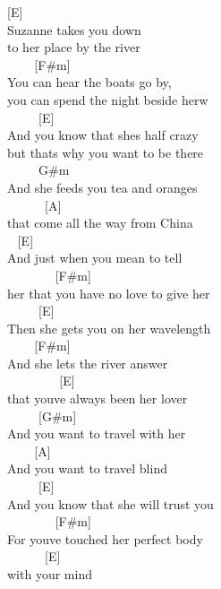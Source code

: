 \documentclass[
  letterpaper,
]{scrbook}
\begin{document}
{[}E{]} ~ ~ ~ ~ ~ ~ ~\\
Suzanne takes you down\\
to her place by the river\\
\hspace*{0.333em} ~ ~ ~{[}F\#m{]} ~ ~ ~ ~ ~\\
You can hear the boats go by,\\
you can spend the night beside herw\\
\hspace*{0.333em} ~ ~ ~ {[}E{]} ~ ~ ~ ~ ~ ~ ~ ~ ~\\
And you know that she\textquotesingle s half crazy\\
but that\textquotesingle s why you want to be there\\
\hspace*{0.333em} ~ ~ ~ G\#m ~ ~ ~ ~ ~ ~\\
And she feeds you tea and oranges\\
\hspace*{0.333em} ~ ~ ~ ~{[}A{]} ~ ~ ~ ~ ~ ~ ~\\
that come all the way from China\\
\hspace*{0.333em} ~ {[}E{]}\\
And just when you mean to tell\\
\hspace*{0.333em} ~ ~ ~ ~ ~{[}F\#m{]}\\
her that you have no love to give her\\
\hspace*{0.333em} ~ ~ ~ {[}E{]}\\
Then she gets you on her wavelength\\
\hspace*{0.333em} ~ ~ ~{[}F\#m{]}\\
And she lets the river answer ~ ~ ~ ~ ~ ~ ~ ~ ~ ~ ~ ~\\
\hspace*{0.333em} ~ ~ ~ ~ ~ {[}E{]}\\
that you\textquotesingle ve always been her lover\\
\hspace*{0.333em} ~ ~ ~ {[}G\#m{]}\\
And you want to travel with her\\
\hspace*{0.333em} ~ ~ ~{[}A{]}\\
And you want to travel blind\\
\hspace*{0.333em} ~ ~ ~ {[}E{]}\\
And you know that she will trust you\\
\hspace*{0.333em} ~ ~ ~ ~ ~{[}F\#m{]} ~ ~ ~\\
For you\textquotesingle ve touched her perfect body ~ ~ ~ ~ ~ ~ ~ ~\\
\hspace*{0.333em} ~ ~ ~ ~{[}E{]}\\
with your mind
\end{document}
